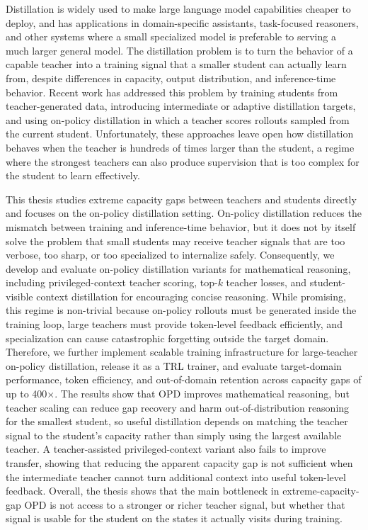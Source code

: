Distillation is widely used to make large language model capabilities cheaper to deploy, and has applications in domain-specific assistants, task-focused reasoners, and other systems where a small specialized model is preferable to serving a much larger general model. The distillation problem is to turn the behavior of a capable teacher into a training signal that a smaller student can actually learn from, despite differences in capacity, output distribution, and inference-time behavior. Recent work has addressed this problem by training students from teacher-generated data, introducing intermediate or adaptive distillation targets, and using on-policy distillation in which a teacher scores rollouts sampled from the current student. Unfortunately, these approaches leave open how distillation behaves when the teacher is hundreds of times larger than the student, a regime where the strongest teachers can also produce supervision that is too complex for the student to learn effectively.

This thesis studies extreme capacity gaps between teachers and students directly and focuses on the on-policy distillation setting. On-policy distillation reduces the mismatch between training and inference-time behavior, but it does not by itself solve the problem that small students may receive teacher signals that are too verbose, too sharp, or too specialized to internalize safely. Consequently, we develop and evaluate on-policy distillation variants for mathematical reasoning, including privileged-context teacher scoring, top-$k$ teacher losses, and student-visible context distillation for encouraging concise reasoning. While promising, this regime is non-trivial because on-policy rollouts must be generated inside the training loop, large teachers must provide token-level feedback efficiently, and specialization can cause catastrophic forgetting outside the target domain. Therefore, we further implement scalable training infrastructure for large-teacher on-policy distillation, release it as a TRL trainer, and evaluate target-domain performance, token efficiency, and out-of-domain retention across capacity gaps of up to 400$\times$. The results show that OPD improves mathematical reasoning, but teacher scaling can reduce gap recovery and harm out-of-distribution reasoning for the smallest student, so useful distillation depends on matching the teacher signal to the student's capacity rather than simply using the largest available teacher. A teacher-assisted privileged-context variant also fails to improve transfer, showing that reducing the apparent capacity gap is not sufficient when the intermediate teacher cannot turn additional context into useful token-level feedback. Overall, the thesis shows that the main bottleneck in extreme-capacity-gap OPD is not access to a stronger or richer teacher signal, but whether that signal is usable for the student on the states it actually visits during training.
